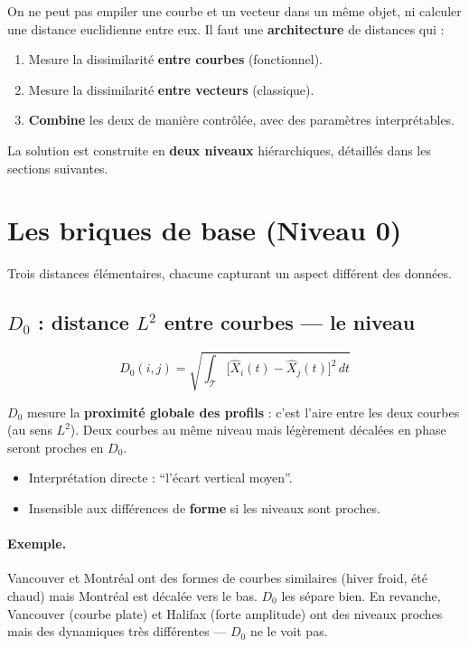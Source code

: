 \documentclass[11pt, a4paper]{article}
\begin{document}
On ne peut pas empiler une courbe et un vecteur dans un même objet, ni
calculer une distance euclidienne entre eux. Il faut une \textbf{architecture}
de distances qui :

\begin{enumerate}[nosep]
  \item Mesure la dissimilarité \textbf{entre courbes} (fonctionnel).
  \item Mesure la dissimilarité \textbf{entre vecteurs} (classique).
  \item \textbf{Combine} les deux de manière contrôlée, avec des paramètres
    interprétables.
\end{enumerate}

La solution est construite en \textbf{deux niveaux} hiérarchiques, détaillés
dans les sections suivantes.

\newpage
\section{Les briques de base (Niveau 0)}

Trois distances élémentaires, chacune capturant un aspect différent des données.

\subsection{$D_0$ : distance $L^2$ entre courbes — le \textbf{niveau}}

\[
  D_0(i,j) = \sqrt{\int_{\mathcal{T}} \bigl[\hat{X}_i(t) - \hat{X}_j(t)\bigr]^2 \, dt}
\]

$D_0$ mesure la \textbf{proximité globale des profils} : c'est l'aire entre
les deux courbes (au sens $L^2$). Deux courbes au même niveau mais
légèrement décalées en phase seront proches en $D_0$.

\begin{itemize}[nosep]
  \item[\textcolor{mix}{$\boldsymbol{+}$}] Interprétation directe : ``l'écart vertical moyen''.
  \item[\textcolor{vect}{$\boldsymbol{-}$}] Insensible aux différences de
    \textbf{forme} si les niveaux sont proches.
\end{itemize}

\paragraph{Exemple.}
Vancouver et Montréal ont des formes de courbes similaires (hiver froid, été
chaud) mais Montréal est décalée vers le bas. $D_0$ les sépare bien. En
revanche, Vancouver (courbe plate) et Halifax (forte amplitude) ont des
niveaux proches mais des dynamiques très différentes — $D_0$ ne le voit pas.
\end{document}
